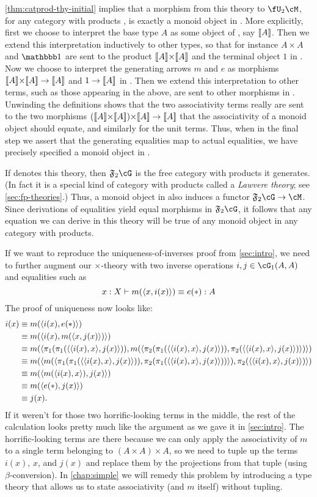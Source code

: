 \cref{thm:catprod-thy-initial} implies that a morphism from this theory to $\fU_2\cM$, for any category with products \cM, is exactly a monoid object in \cM.
More explicitly, first we choose to interpret the base type $A$ as some object of \cM, say $\llbracket A\rrbracket$.
Then we extend this interpretation inductively to other types, so that for instance $A\times A$ and $\unit$ are sent to the product $\m A \times \m A$ and the terminal object $1$ in \cM.
Now we choose to interpret the generating arrows $m$ and $e$ as morphisms $\m A \times \m A \to \m A$ and $1\to \llbracket A\rrbracket$ in \cM.
Then we extend this interpretation to other terms, such as those appearing in the above, are sent to other morphisms in \cM.
Unwinding the definitions shows that the two associativity terms really are sent to the two morphisms $(\m A\times \m A)\times \m A \to \m A$ that the associativity of a monoid object should equate, and similarly for the unit terms.
Thus, when in the final step we assert that the generating equalities map to actual equalities, we have precisely specified a monoid object in \cM.

If \cG denotes this theory, then $\F{2}\cG$ is the free category with products it generates.
(In fact it is a special kind of category with products called a \emph{Lawvere theory}; see \cref{sec:fp-theories}.)
Thus, a monoid object in \cM also induces a functor $\F{2}\cG\to\cM$.
Since derivations of equalities yield equal morphisms in $\F2\cG$, it follows that any equation we can derive in this theory will be true of any monoid object in any category with products.

If we want to reproduce the uniqueness-of-inverses proof from \cref{sec:intro}, we need to further augment our $\times$-theory with two inverse operations $i,j \in \cG_1(A,A)$ and equalities such as
\[ x:X \vdash m(\langle x,i(x)\rangle) \equiv e(\mathord{\ast}) : A \]
The proof of uniqueness now looks like:
\begin{align*}
  i(x)
  &\equiv m(\langle i(x),e(\mathord{\ast})\rangle)\\
  &\equiv m(\langle i(x),m(\langle x,j(x)\rangle)\rangle)\\
  &\equiv m(\langle \pi_1(\pi_1(\langle \langle i(x),x\rangle,j(x)\rangle)),m(\langle \pi_2(\pi_1(\langle \langle i(x),x\rangle,j(x)\rangle)),\pi_2(\langle \langle i(x),x\rangle,j(x)\rangle)\rangle)\rangle)\\
  &\equiv m(\langle m(\langle \pi_1(\pi_1(\langle \langle i(x),x\rangle,j(x)\rangle)),\pi_2(\pi_1(\langle \langle i(x),x\rangle,j(x)\rangle))\rangle),\pi_2(\langle \langle i(x),x\rangle,j(x)\rangle)\rangle)\\
  &\equiv m(\langle m(\langle i(x),x\rangle),j(x)\rangle)\\
  &\equiv m(\langle e(\mathord{\ast}),j(x)\rangle)\\
  &\equiv j(x).
\end{align*}
If it weren't for those two horrific-looking terms in the middle, the rest of the calculation looks pretty much like the argument as we gave it in \cref{sec:intro}.
The horrific-looking terms are there because we can only apply the associativity of $m$ to a single term belonging to $(A\times A)\times A$, so we need to tuple up the terms $i(x)$, $x$, and $j(x)$ and replace them by the projections from that tuple (using $\beta$-conversion).
In \cref{chap:simple} we will remedy this problem by introducing a type theory that allows us to state associativity (and $m$ itself) without tupling.

